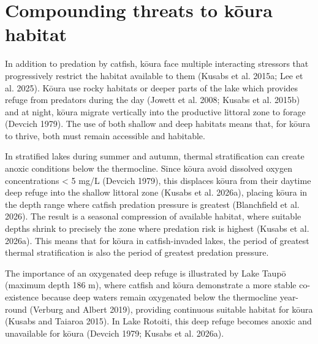 \documentclass[
  12pt,
  a4paper,
  oneside]{scrbook}
\begin{document}
\section{Compounding threats to kōura
habitat}\label{compounding-threats-to-kux14dura-habitat}

In addition to predation by catfish, kōura face multiple interacting
stressors that progressively restrict the habitat available to them
(Kusabs et al. 2015a; Lee et al. 2025). Kōura use rocky habitats or
deeper parts of the lake which provides refuge from predators during the
day (Jowett et al. 2008; Kusabs et al. 2015b) and at night, kōura
migrate vertically into the productive littoral zone to forage (Devcich
1979). The use of both shallow and deep habitats means that, for kōura
to thrive, both must remain accessible and habitable.

In stratified lakes during summer and autumn, thermal stratification can
create anoxic conditions below the thermocline. Since kōura avoid
dissolved oxygen concentrations \textless{} 5 mg/L (Devcich 1979), this
displaces kōura from their daytime deep refuge into the shallow littoral
zone (Kusabs et al. 2026a), placing kōura in the depth range where
catfish predation pressure is greatest (Blanchfield et al. 2026). The
result is a seasonal compression of available habitat, where suitable
depths shrink to precisely the zone where predation risk is highest
(Kusabs et al. 2026a). This means that for kōura in catfish-invaded
lakes, the period of greatest thermal stratification is also the period
of greatest predation pressure.

The importance of an oxygenated deep refuge is illustrated by Lake Taupō
(maximum depth 186 m), where catfish and kōura demonstrate a more stable
co-existence because deep waters remain oxygenated below the thermocline
year-round (Verburg and Albert 2019), providing continuous suitable
habitat for kōura (Kusabs and Taiaroa 2015). In Lake Rotoiti, this deep
refuge becomes anoxic and unavailable for kōura (Devcich 1979; Kusabs et
al. 2026a).
\end{document}
